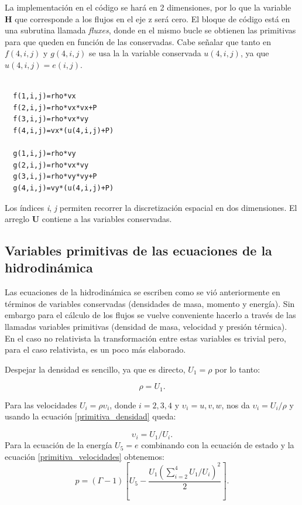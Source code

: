 \documentclass[12pt,a4paper]{book}
\begin{document}
La implementación en el código se hará en 2 dimensiones, por lo que la variable $\mathbf{H}$ que corresponde a los flujos en el eje z será cero. El bloque de código está en una subrutina llamada \emph{fluxes}, 
donde en el mismo bucle se obtienen las primitivas para que queden en función de las conservadas. Cabe señalar que tanto en $f(4,i,j)$ y $g(4,i,j)$ se usa la
la variable conservada $u(4,i,j)$, ya que $u(4,i,j) = e(i,j)$. 

\begin{lstlisting}[frame=single]

  f(1,i,j)=rho*vx
  f(2,i,j)=rho*vx*vx+P
  f(3,i,j)=rho*vx*vy
  f(4,i,j)=vx*(u(4,i,j)+P)

  g(1,i,j)=rho*vy
  g(2,i,j)=rho*vx*vy
  g(3,i,j)=rho*vy*vy+P
  g(4,i,j)=vy*(u(4,i,j)+P)

\end{lstlisting}

Los índices \emph{i}, \emph{j} permiten recorrer la discretización espacial en dos dimensiones. 
El arreglo $\mathbf{U}$ contiene a las variables conservadas.

\subsection{Variables primitivas de las ecuaciones de la hidrodinámica}\label{subsec:DesacoplamientoEcuacionesHidrodinamica}

Las ecuaciones de la hidrodinámica se escriben como se vió anteriormente en términos de variables conservadas (densidades de masa, momento y energía).
Sin embargo para el cálculo de los flujos se vuelve conveniente hacerlo a través de las llamadas variables primitivas (densidad de masa, velocidad y presión térmica).
En el caso no relativista la transformación entre estas variables es trivial pero, para el caso relativista, es un poco más elaborado.

Despejar la densidad es sencillo, ya que es directo, $U_1= \rho$ por lo tanto:

\begin{equation}\label{primitiva_densidad}
\rho = U_1.
\end{equation}

\noindent Para las velocidades $U_i=\rho \upsilon_i$, donde $i=2,3,4$ y $\upsilon_i=u,v,w$, nos da $\upsilon_i= U_i/ \rho$ y usando la ecuación \ref{primitiva_densidad} queda:

\begin{equation} \label{primitiva_velocidades}
\upsilon_i = U_1/U_i.
\end{equation}
Para la ecuación   de la energía $U_5=e$ combinando con la ecuación   de estado y la ecuación \ref{primitiva_velocidades} obtenemos:
\begin{equation}
p = \left( \Gamma - 1 \right) \left[ U_5 - \frac{U_1 \left( \sum_{i=2}^{4} U_1/U_i \right)^2}{2} \right].
\end{equation}
\end{document}
